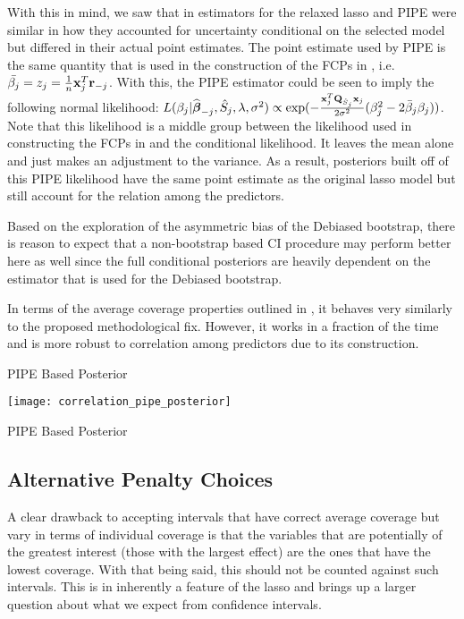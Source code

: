 With this in mind, we saw that in  estimators for the relaxed lasso and PIPE were similar in how they accounted for uncertainty conditional on the selected model but differed in their actual point estimates. The point estimate used by PIPE is the same quantity that is used in the construction of the FCPs in , i.e. $\bar{\beta_j} = z_j = \frac{1}{n}\mathbf{x}_j^T\mathbf{r}_{-j}$. With this, the PIPE estimator could be seen to imply the following normal likelihood: $L(\beta_j|\widehat{\boldsymbol{\beta}}_{-j}, \hat{S}_j, \lambda, \sigma^2) \propto \exp(-\frac{\mathbf{x}_j^T \mathbf{Q}_{\hat{S}_j} \mathbf{x}_j}{2\sigma^2}(\beta_{j}^2 - 2 \bar{\beta}_{j} \beta_{j}))$. Note that this likelihood is a middle group between the likelihood used in constructing the FCPs in  and the conditional likelihood. It leaves the mean alone and just makes an adjustment to the variance. As a result, posteriors built off of this PIPE likelihood have the same point estimate as the original lasso model but still account for the relation among the predictors.

Based on the exploration of the asymmetric bias of the Debiased bootstrap, there is reason to expect that a non-bootstrap based CI procedure may perform better here as well since the full conditional posteriors are heavily dependent on the estimator that is used for the Debiased bootstrap.

In terms of the average coverage properties outlined in , it behaves very similarly to the proposed methodological fix. However, it works in a fraction of the time and is more robust to correlation among predictors due to its construction. 

\begin{table}[hbtp]
    \centering
    
    \caption{\label{Tab:dist_beta} PIPE Based Posterior}
\end{table}

\begin{table}[hbtp]
    \centering
    \texttt{[image: correlation\_pipe\_posterior]}
    \caption{\label{Fig:corr_pipe} PIPE Based Posterior}
\end{table}
    
\subsection{Alternative Penalty Choices}

A clear drawback to accepting intervals that have correct average coverage but vary in terms of individual coverage is that the variables that are potentially of the greatest interest (those with the largest effect) are the ones that have the lowest coverage. With that being said, this should not be counted against such intervals. This is in inherently a feature of the lasso and brings up a larger question about what we expect from confidence intervals. 


